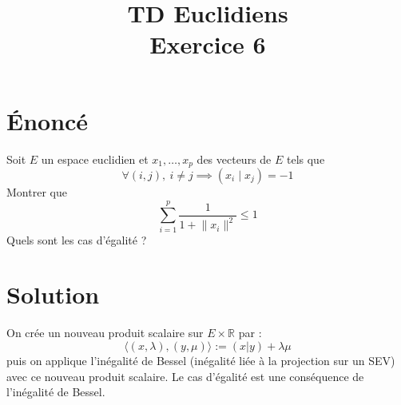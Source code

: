 \documentclass[french]{article}
\title{TD Euclidiens\\ Exercice 6}
\date{}
\newcommand{\R}{\mathbb{R}}
\begin{document}
\maketitle

\section{Énoncé}
	Soit $E$ un espace euclidien et $x_1,\ldots,x_p$ des vecteurs de $E$ tels que $$\forall (i,j),\ i\ne j\implies (x_i\mid x_j)=-1$$ Montrer que $$\sum_{i=1}^{p}\frac{1}{1+\lVert x_i\rVert^2}\leqslant 1$$ Quels sont les cas d'égalité ?

\section{Solution}
	On crée un nouveau produit scalaire sur $E\times\R$ par : $$\langle (x,\lambda),(y,\mu)\rangle:=(x|y)+\lambda\mu$$ puis on applique l'inégalité de Bessel (inégalité liée à la projection sur un SEV) avec ce nouveau produit scalaire. Le cas d'égalité est une conséquence de l'inégalité de Bessel.
\end{document}
